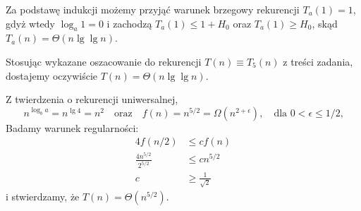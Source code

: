 Za podstawę indukcji możemy przyjąć warunek brzegowy rekurencji $T_a(1)=1$, gdyż wtedy $\log_a1=0$ i zachodzą $T_a(1)\le 1+H_0$ oraz $T_a(1)\ge H_0$, skąd $T_a(n)=\Theta(n\lg\lg n)$.

% 

Stosując wykazane oszacowanie do rekurencji $T(n)\equiv T_5(n)$ z treści zadania, dostajemy oczywiście $T(n)=\Theta(n\lg\lg n)$.

\subexercise{} %
Z twierdzenia o rekurencji uniwersalnej,
\[
	n^{\log_ba} = n^{\lg4} = n^2 \quad\text{oraz}\quad f(n) = n^{5/2} = \Omega(n^{2+\epsilon}), \quad\text{dla $0<\epsilon\le1/2$,}
\]
Badamy warunek regularności:
\begin{align*}
	4f(n/2) &\le cf(n) \\
	\frac{4n^{5/2}}{2^{5/2}} &\le cn^{5/2} \\
	c &\ge \frac{1}{\sqrt{2}}
\end{align*}
i stwierdzamy, że $T(n)=\Theta(n^{5/2})$.

